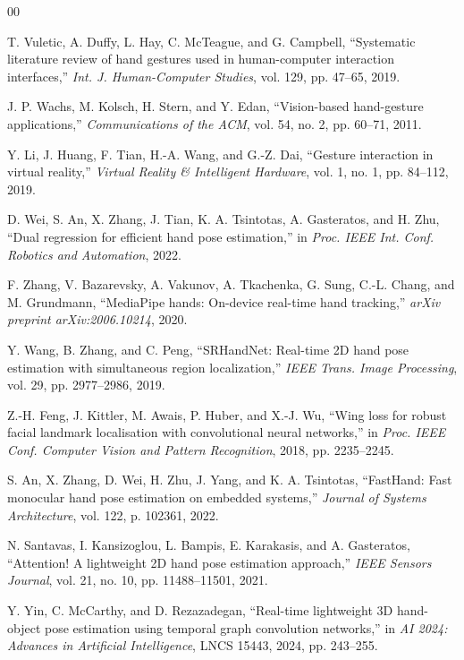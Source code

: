 \documentclass[10pt,letterpaper]{article}
\begin{document}
\clearpage
\begin{thebibliography}{00}

T. Vuletic, A. Duffy, L. Hay, C. McTeague, and G. Campbell, ``Systematic literature review of hand gestures used in human-computer interaction interfaces,'' \emph{Int. J. Human-Computer Studies}, vol. 129, pp. 47--65, 2019.

J. P. Wachs, M. Kolsch, H. Stern, and Y. Edan, ``Vision-based hand-gesture applications,'' \emph{Communications of the ACM}, vol. 54, no. 2, pp. 60--71, 2011.

Y. Li, J. Huang, F. Tian, H.-A. Wang, and G.-Z. Dai, ``Gesture interaction in virtual reality,'' \emph{Virtual Reality \& Intelligent Hardware}, vol. 1, no. 1, pp. 84--112, 2019.

D. Wei, S. An, X. Zhang, J. Tian, K. A. Tsintotas, A. Gasteratos, and H. Zhu, ``Dual regression for efficient hand pose estimation,'' in \emph{Proc. IEEE Int. Conf. Robotics and Automation}, 2022.

F. Zhang, V. Bazarevsky, A. Vakunov, A. Tkachenka, G. Sung, C.-L. Chang, and M. Grundmann, ``MediaPipe hands: On-device real-time hand tracking,'' \emph{arXiv preprint arXiv:2006.10214}, 2020.

Y. Wang, B. Zhang, and C. Peng, ``SRHandNet: Real-time 2D hand pose estimation with simultaneous region localization,'' \emph{IEEE Trans. Image Processing}, vol. 29, pp. 2977--2986, 2019.

Z.-H. Feng, J. Kittler, M. Awais, P. Huber, and X.-J. Wu, ``Wing loss for robust facial landmark localisation with convolutional neural networks,'' in \emph{Proc. IEEE Conf. Computer Vision and Pattern Recognition}, 2018, pp. 2235--2245.

S. An, X. Zhang, D. Wei, H. Zhu, J. Yang, and K. A. Tsintotas, ``FastHand: Fast monocular hand pose estimation on embedded systems,'' \emph{Journal of Systems Architecture}, vol. 122, p. 102361, 2022.

N. Santavas, I. Kansizoglou, L. Bampis, E. Karakasis, and A. Gasteratos, ``Attention! A lightweight 2D hand pose estimation approach,'' \emph{IEEE Sensors Journal}, vol. 21, no. 10, pp. 11488--11501, 2021.

Y. Yin, C. McCarthy, and D. Rezazadegan, ``Real-time lightweight 3D hand-object pose estimation using temporal graph convolution networks,'' in \emph{AI 2024: Advances in Artificial Intelligence}, LNCS 15443, 2024, pp. 243--255.


\end{thebibliography}
\end{document}
